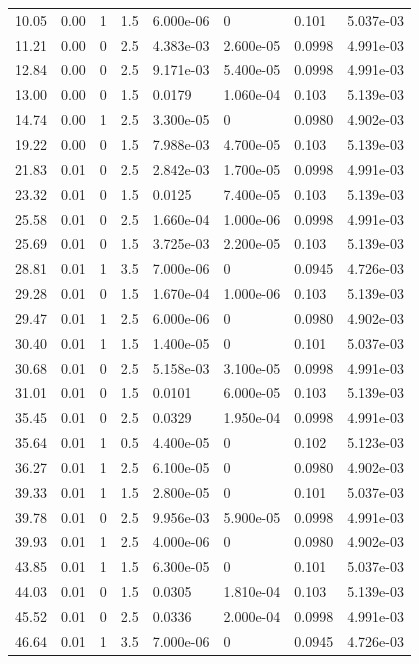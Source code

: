 \documentclass[preview]{standalone}
\begin{document}
{{\begin{tabular}{L{1.2cm}C{1.2cm} C{0.3cm}C{0.5cm} C{1.4cm}C{1.4cm} C{1.4cm}C{1.4cm}}
  10.05  &  0.00  & 1     & 1.5 &  6.000e-06  & 0  & 0.101 &  5.037e-03   \\ 
  11.21  &  0.00  & 0     & 2.5 &  4.383e-03  & 2.600e-05  & 0.0998 &  4.991e-03   \\ 
  12.84  &  0.00  & 0     & 2.5 &  9.171e-03  & 5.400e-05  & 0.0998 &  4.991e-03   \\ 
  13.00  &  0.00  & 0     & 1.5 &  0.0179  & 1.060e-04  & 0.103 &  5.139e-03   \\ 
  14.74  &  0.00  & 1     & 2.5 &  3.300e-05  & 0  & 0.0980 &  4.902e-03   \\ 
  19.22  &  0.00  & 0     & 1.5 &  7.988e-03  & 4.700e-05  & 0.103 &  5.139e-03   \\ 
  21.83  &  0.01  & 0     & 2.5 &  2.842e-03  & 1.700e-05  & 0.0998 &  4.991e-03   \\ 
  23.32  &  0.01  & 0     & 1.5 &  0.0125  & 7.400e-05  & 0.103 &  5.139e-03   \\ 
  25.58  &  0.01  & 0     & 2.5 &  1.660e-04  & 1.000e-06  & 0.0998 &  4.991e-03   \\ 
  25.69  &  0.01  & 0     & 1.5 &  3.725e-03  & 2.200e-05  & 0.103 &  5.139e-03   \\ 
  28.81  &  0.01  & 1     & 3.5 &  7.000e-06  & 0  & 0.0945 &  4.726e-03   \\ 
  29.28  &  0.01  & 0     & 1.5 &  1.670e-04  & 1.000e-06  & 0.103 &  5.139e-03   \\ 
  29.47  &  0.01  & 1     & 2.5 &  6.000e-06  & 0  & 0.0980 &  4.902e-03   \\ 
  30.40  &  0.01  & 1     & 1.5 &  1.400e-05  & 0  & 0.101 &  5.037e-03   \\ 
  30.68  &  0.01  & 0     & 2.5 &  5.158e-03  & 3.100e-05  & 0.0998 &  4.991e-03   \\ 
  31.01  &  0.01  & 0     & 1.5 &  0.0101  & 6.000e-05  & 0.103 &  5.139e-03   \\ 
  35.45  &  0.01  & 0     & 2.5 &  0.0329  & 1.950e-04  & 0.0998 &  4.991e-03   \\ 
  35.64  &  0.01  & 1     & 0.5 &  4.400e-05  & 0  & 0.102 &  5.123e-03   \\ 
  36.27  &  0.01  & 1     & 2.5 &  6.100e-05  & 0  & 0.0980 &  4.902e-03   \\ 
  39.33  &  0.01  & 1     & 1.5 &  2.800e-05  & 0  & 0.101 &  5.037e-03   \\ 
  39.78  &  0.01  & 0     & 2.5 &  9.956e-03  & 5.900e-05  & 0.0998 &  4.991e-03   \\ 
  39.93  &  0.01  & 1     & 2.5 &  4.000e-06  & 0  & 0.0980 &  4.902e-03   \\ 
  43.85  &  0.01  & 1     & 1.5 &  6.300e-05  & 0  & 0.101 &  5.037e-03   \\ 
  44.03  &  0.01  & 0     & 1.5 &  0.0305  & 1.810e-04  & 0.103 &  5.139e-03   \\ 
  45.52  &  0.01  & 0     & 2.5 &  0.0336  & 2.000e-04  & 0.0998 &  4.991e-03   \\ 
  46.64  &  0.01  & 1     & 3.5 &  7.000e-06  & 0  & 0.0945 &  4.726e-03   \\ 
\hline 
\end{tabular} 

}}
\end{document}
